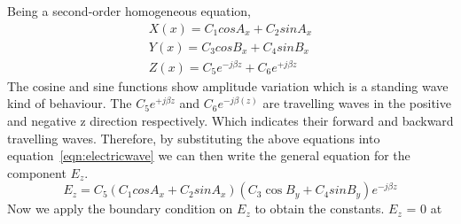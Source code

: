Being a second-order homogeneous equation,   
\begin{align*}
X(x) = C_{1}cos A_{x} + C_{2}sin A_{x}\\
Y(x) = C_{3}cos B_{x} + C_{4}sin B_{x}\\
Z(x) = C_{5} e^{-j \beta z} + C_{6} e^{+j \beta z}
\end{align*}                                  
The cosine and sine functions show amplitude variation which is a standing wave kind of behaviour. The $C_{5}e^{+j\beta z}$ and $C_{6}e^{-j\beta(z)}$ are travelling waves in the positive and negative z direction respectively. 
Which indicates their forward and backward travelling waves.
Therefore, by substituting the above equations into equation~\ref{eqn:electricwave} we can then write the general equation for the component $E_{z}$.
\begin{equation*}
E_{z} = C_{5}(C_{1}cos A_{x} + C_{2}sin A_{x})(C_{3}\cos B_{y} + C_{4}sin B_{y}) e^{-j\beta z}
\end{equation*}
Now we apply the boundary condition on $E_{z}$ to obtain the constants. $E_{z}$ = 0 at  

